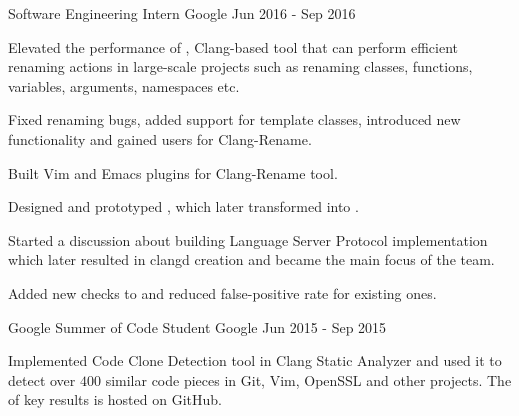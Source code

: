 \begin{cventries}
  \cventry
    {Software Engineering Intern}
    {Google}
    {}
    {Jun 2016 - Sep 2016}
    {
      \begin{cvitems}
        \item Elevated the performance of
          ,
          Clang-based tool that can perform efficient renaming actions in
          large-scale projects such as renaming classes, functions, variables,
          arguments, namespaces etc.
        \item Fixed renaming bugs, added support for template classes,
	  introduced new functionality and gained users for Clang-Rename.
        \item Built Vim and Emacs plugins for Clang-Rename tool.
        \item Designed and prototyped
          ,
          which later transformed into .
        \item Started a discussion about building Language Server Protocol
          implementation which later resulted in clangd creation and became the
          main focus of the team.
        \item Added new checks to
           and
          reduced false-positive rate for existing ones.
      \end{cvitems}
    }

  \cventry
    {Google Summer of Code Student}
    {Google}
    {}
    {Jun 2015 - Sep 2015}
    {
      \begin{cvitems}
        Implemented Code Clone Detection tool in Clang Static Analyzer and used
        it to detect over $400$ similar code pieces in Git, Vim, OpenSSL and
        other projects. The
        of key results is hosted on GitHub.
      \end{cvitems}
    }

\end{cventries}
